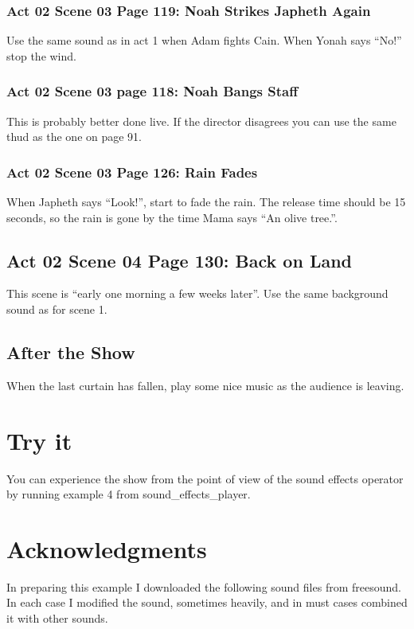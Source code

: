 \documentclass[letterpaper,twoside]{article}
\begin{document}
\subsubsection{Act 02 Scene 03 Page 119: Noah Strikes Japheth Again}
Use the same sound as in act 1 when Adam fights Cain.
When Yonah says ``No!'' stop the wind.

\subsubsection{Act 02 Scene 03 page 118: Noah Bangs Staff}
This is probably better done live.  If the director disagrees
you can use the same thud as the one on page 91.

\subsubsection{Act 02 Scene 03 Page 126: Rain Fades}
When Japheth says ``Look!'', start to fade the rain.
The release time should be 15 seconds, so the rain is gone
by the time Mama says ``An olive tree.''.

\subsection{Act 02 Scene 04 Page 130: Back on Land}
This scene is ``early one morning a few weeks later''.
Use the same background sound as for scene 1.

\subsection{After the Show}
When the last curtain has fallen, play some nice music as the audience
is leaving.

\section{Try it}
You can experience the show from the point of view of the sound
effects operator by running example 4 from sound\_effects\_player.
  
\section{Acknowledgments}

In preparing this example I downloaded the following sound files
from freesound.  In each case I modified the sound, sometimes heavily,
and in must cases combined it with other sounds.
\end{document}
